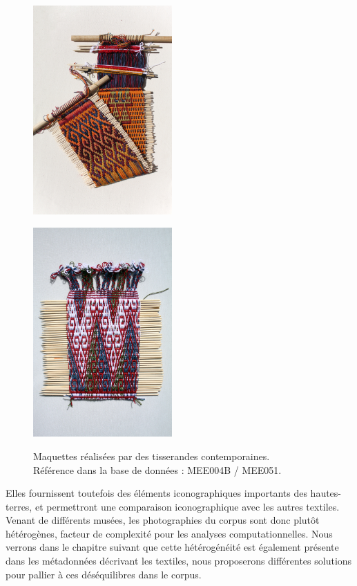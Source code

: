 \begin{figure}[!h]
    \begin{minipage}[c]{.5\linewidth}
            \begin{center}
                \includegraphics[height=8cm]{../images/MEE004B.jpg}
            \end{center}
    \label{fig:MEE004B}
    \end{minipage}
    \begin{minipage}[c]{.5\linewidth}
        \begin{center}
        		\includegraphics[height=8cm]{../images/MEE051.jpg}
	\end{center}
    \label{fig:MEE051}   
    \end{minipage}
     \caption{Maquettes réalisées par des tisserandes contemporaines.\\ Référence dans la base de données : MEE004B / MEE051.}
\end{figure}

Elles fournissent toutefois des éléments iconographiques importants des hautes-terres, et permettront une comparaison iconographique avec les autres textiles. Venant de différents musées, les photographies du corpus sont donc plutôt hétérogènes, facteur de complexité pour les analyses computationnelles. Nous verrons dans le chapitre suivant que cette hétérogénéité est également présente dans les métadonnées décrivant les textiles, nous proposerons différentes solutions pour pallier à ces déséquilibres dans le corpus.\\

